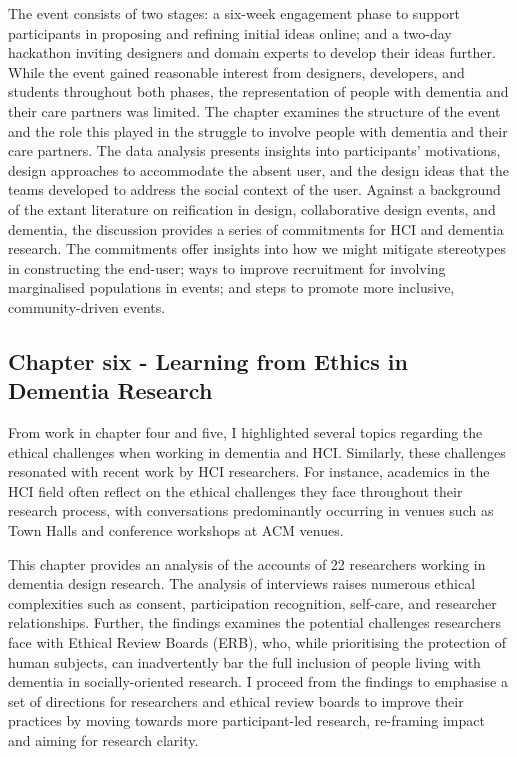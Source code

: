 The event consists of two stages: a six-week engagement phase to support participants in proposing and refining initial ideas online; and a two-day hackathon inviting designers and domain experts to develop their ideas further. While the event gained reasonable interest from designers, developers, and students throughout both phases, the representation of people with dementia and their care partners was limited. The chapter examines the structure of the event and the role this played in the struggle to involve people with dementia and their care partners. The data analysis presents insights into participants’ motivations, design approaches to accommodate the absent user, and the design ideas that the teams developed to address the social context of the user. Against a background of the extant literature on reification in design, collaborative design events, and dementia, the discussion provides a series of commitments for HCI and dementia research. The commitments offer insights into how we might mitigate stereotypes in constructing the end-user; ways to improve recruitment for involving marginalised populations in events; and steps to promote more inclusive, community-driven events. 

\subsection{Chapter six - Learning from Ethics in Dementia Research}
\label{Intro:ChapterSix}
From work in chapter four and five, I highlighted several topics regarding the ethical challenges when working in dementia and HCI. Similarly, these challenges resonated with recent work by HCI researchers. For instance, academics in the HCI field often reflect on the ethical challenges they face throughout their research process, with conversations predominantly occurring in venues such as Town Halls and conference workshops at ACM venues.

This chapter provides an analysis of the accounts of 22 researchers working in dementia design research. The analysis of interviews raises numerous ethical complexities such as consent, participation recognition, self-care, and researcher relationships. Further, the findings examines the potential challenges researchers face with Ethical Review Boards (ERB), who, while prioritising the protection of human subjects, can inadvertently bar the full inclusion of people living with dementia in socially-oriented research. I proceed from the findings to emphasise a set of directions for researchers and ethical review boards to improve their practices by moving towards more participant-led research, re-framing impact and aiming for research clarity.

